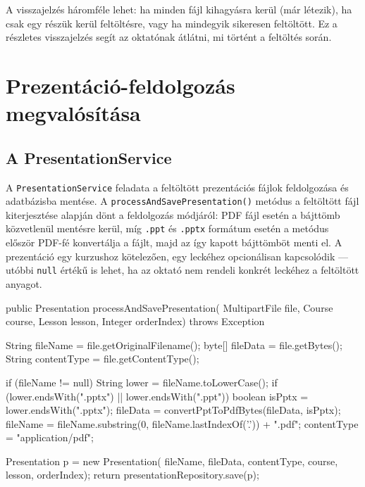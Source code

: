A visszajelzés háromféle lehet: ha minden fájl kihagyásra kerül (már létezik), ha csak egy részük kerül feltöltésre, vagy ha mindegyik sikeresen feltöltött. Ez a részletes visszajelzés segít az oktatónak átlátni, mi történt a feltöltés során.


\section{Prezentáció-feldolgozás megvalósítása}

\subsection{A PresentationService}

A \texttt{PresentationService} feladata a feltöltött prezentációs fájlok feldolgozása és adatbázisba mentése. A \texttt{processAndSavePresentation()} metódus a feltöltött fájl kiterjesztése alapján dönt a feldolgozás módjáról: PDF fájl esetén a bájttömb közvetlenül mentésre kerül, míg \texttt{.ppt} és \texttt{.pptx} formátum esetén a metódus először PDF-fé konvertálja a fájlt, majd az így kapott bájttömböt menti el. A prezentáció egy kurzushoz kötelezően, egy leckéhez opcionálisan kapcsolódik — utóbbi \texttt{null} értékű is lehet, ha az oktató nem rendeli konkrét leckéhez a feltöltött anyagot.

\begin{java}[caption={A prezentáció-feldolgozó metódus},label=java:presentservice]
public Presentation processAndSavePresentation(
        MultipartFile file, Course course,
        Lesson lesson, Integer orderIndex) throws Exception {
    String fileName    = file.getOriginalFilename();
    byte[] fileData    = file.getBytes();
    String contentType = file.getContentType();

    if (fileName != null) {
        String lower = fileName.toLowerCase();
        if (lower.endsWith(".pptx") || lower.endsWith(".ppt")) {
            boolean isPptx = lower.endsWith(".pptx");
            fileData    = convertPptToPdfBytes(fileData, isPptx);
            fileName    = fileName.substring(0,
                            fileName.lastIndexOf('.')) + ".pdf";
            contentType = "application/pdf";
        }
    }

    Presentation p = new Presentation(
            fileName, fileData, contentType, course, lesson, orderIndex);
    return presentationRepository.save(p);
}
\end{java}


